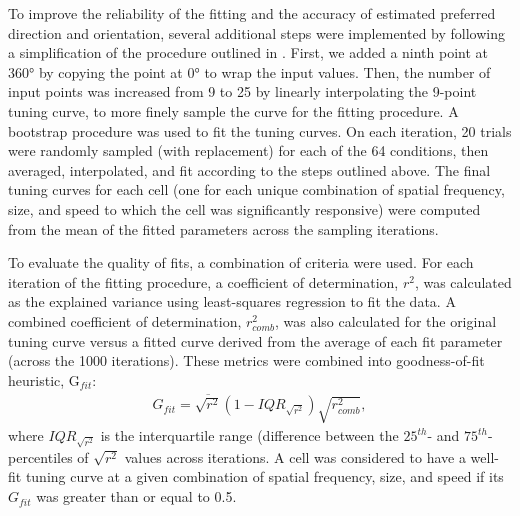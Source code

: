 To improve the reliability of the fitting and the accuracy of estimated preferred direction and orientation, several additional steps were implemented by following a simplification of the procedure outlined in \cite{Liang2018}. First, we added a ninth point at \ang{360} by copying the point at \ang{0} to wrap the input values. Then, the number of input points was increased from 9 to 25 by linearly interpolating the 9-point tuning curve, to more finely sample the curve for the fitting procedure.  
A bootstrap procedure was used to fit the tuning curves. On each iteration, 20 trials were randomly sampled (with replacement) for each of the 64 conditions, then averaged, interpolated, and fit according to the steps outlined above. The final tuning curves for each cell (one for each unique combination of spatial frequency, size, and speed to which the cell was significantly responsive) were computed from the mean of the fitted parameters across the sampling iterations. 

To evaluate the quality of fits, a combination of criteria were used\cite{Liang2018}. For each iteration of the fitting procedure, a coefficient of determination, $r^2$, was calculated as the explained variance using least-squares regression to fit the data\cite{More1978, Virtanen2020}. A combined coefficient of determination, $r_{comb}^2$, was also calculated for the original tuning curve versus a fitted curve derived from the average of each fit parameter (across the 1000 iterations). These metrics were combined into goodness-of-fit heuristic, G$_{fit}$: 
\begin{align}
    G_{fit}=\overline{\sqrt{r^2}} (1-IQR_{\sqrt{r^2}}) \sqrt{r_{comb}^2},
\end{align}
where $IQR_{\sqrt{r^2}}$ is the interquartile range (difference between the $25^{th}$- and $75^{th}$-percentiles of $\sqrt{r^2}$ values across iterations. A cell was considered to have a well-fit tuning curve at a given combination of spatial frequency, size, and speed if its $G_{fit}$ was greater than or equal to 0.5. 

